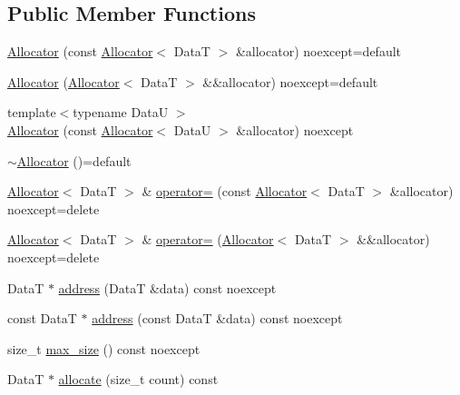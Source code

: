 \subsection*{Public Member Functions}
\begin{DoxyCompactItemize}
\item 
\hyperlink{structmage_1_1_memory_arena_1_1_allocator_a1cdd684969c4fdca577f86e1411db76d}{Allocator} (const \hyperlink{structmage_1_1_memory_arena_1_1_allocator}{Allocator}$<$ DataT $>$ \&allocator) noexcept=default
\item 
\hyperlink{structmage_1_1_memory_arena_1_1_allocator_a5a8abb2140b88e2ed4deb1281b4c66d6}{Allocator} (\hyperlink{structmage_1_1_memory_arena_1_1_allocator}{Allocator}$<$ DataT $>$ \&\&allocator) noexcept=default
\item 
{\footnotesize template$<$typename DataU $>$ }\\\hyperlink{structmage_1_1_memory_arena_1_1_allocator_a9485ec7437c3c798a37c67631aa7e8ab}{Allocator} (const \hyperlink{structmage_1_1_memory_arena_1_1_allocator}{Allocator}$<$ DataU $>$ \&allocator) noexcept
\item 
\hyperlink{structmage_1_1_memory_arena_1_1_allocator_a3324ead39d8cdfb8a119425879101e0a}{$\sim$\+Allocator} ()=default
\item 
\hyperlink{structmage_1_1_memory_arena_1_1_allocator}{Allocator}$<$ DataT $>$ \& \hyperlink{structmage_1_1_memory_arena_1_1_allocator_a4d05273b71981e73fc561c54d6006a1d}{operator=} (const \hyperlink{structmage_1_1_memory_arena_1_1_allocator}{Allocator}$<$ DataT $>$ \&allocator) noexcept=delete
\item 
\hyperlink{structmage_1_1_memory_arena_1_1_allocator}{Allocator}$<$ DataT $>$ \& \hyperlink{structmage_1_1_memory_arena_1_1_allocator_a3211375e2861e7268cc84b3bf3421665}{operator=} (\hyperlink{structmage_1_1_memory_arena_1_1_allocator}{Allocator}$<$ DataT $>$ \&\&allocator) noexcept=delete
\item 
DataT $\ast$ \hyperlink{structmage_1_1_memory_arena_1_1_allocator_a0c93aee3ba1247b1ad34b304f00418fd}{address} (DataT \&data) const noexcept
\item 
const DataT $\ast$ \hyperlink{structmage_1_1_memory_arena_1_1_allocator_a823bf66f6693fc85b2ccb146e1c0ba58}{address} (const DataT \&data) const noexcept
\item 
size\+\_\+t \hyperlink{structmage_1_1_memory_arena_1_1_allocator_a6a68403f6f6a3c381b1ddff02cb8a733}{max\+\_\+size} () const noexcept
\item 
DataT $\ast$ \hyperlink{structmage_1_1_memory_arena_1_1_allocator_a46d428590d87f47742abc173858ccc95}{allocate} (size\+\_\+t count) const

\end{DoxyCompactItemize}
